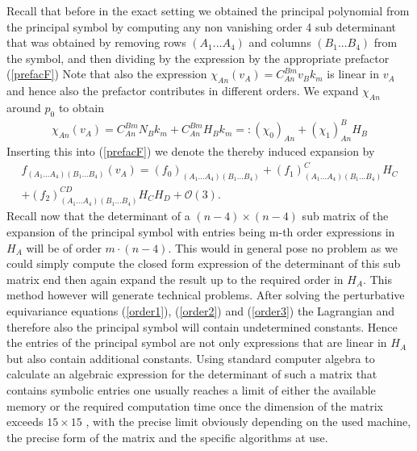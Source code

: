 \documentclass[a4paper,12pt, DIV=14, BCOR=5mm, twoside, headsepline]{scrbook}
\begin{document}
Recall that before in the exact setting we obtained the principal polynomial from the principal symbol by computing any non vanishing order 4 sub determinant that was obtained by removing rows $(A_1...A_4)$ and columns $(B_1...B_4)$ from the symbol, and then dividing by the expression by the appropriate prefactor (\ref{prefacF})
Note that also the expression $\chi_{An}(v_A) = C_{An}^{Bm}v_Bk_m$ is linear in $v_A$ and hence also the prefactor contributes in different orders. We expand $\chi_{An}$ around $p_0$ to obtain
\begin{align}
\chi_{An}(v_A) =  C^{Bm}_{An} N_B k_m + C^{Bm}_{An} H_B k_m =: (\chi_0)_{An} + (\chi_1)^B_{An}H_B
\end{align}
Inserting this into (\ref{prefacF}) we denote the thereby induced expansion by
\begin{multline}\label{prefacExp}
    f_{(A_1...A_4)(B_1...B_4)}(v_A) = (f_0)_{(A_1...A_4)(B_1...B_4)} + (f_1)^C_{(A_1...A_4)(B_1...B_4)}H_C\\ + (f_2)^{CD}_{(A_1...A_4)(B_1...B_4)}H_CH_D
    + \mathcal{O}(3).
\end{multline}
Recall now that the determinant of a $(n-4) \times (n-4)$ sub matrix of the expansion of the principal symbol with entries being m-th order expressions in $H_A$ will be of order $m\cdot(n-4)$. This would in general pose no problem as we could simply compute the closed form expression of the determinant of this sub matrix end then again expand the result up to the required order in $H_A$. This method however will generate technical problems. After solving the perturbative equivariance equations (\ref{order1}), (\ref{order2}) and (\ref{order3}) the Lagrangian and therefore also the principal symbol will contain undetermined constants. Hence the entries of the principal symbol are not only expressions that are linear in $H_A$ but also contain additional constants. Using standard computer algebra to calculate an algebraic expression for the determinant of such a matrix that contains symbolic entries one usually reaches a limit of either the available memory or the required computation time once the dimension of the matrix exceeds $15 \times 15$ , with the precise limit obviously depending on the used machine, the precise form of the matrix and the specific algorithms at use. 
\end{document}
